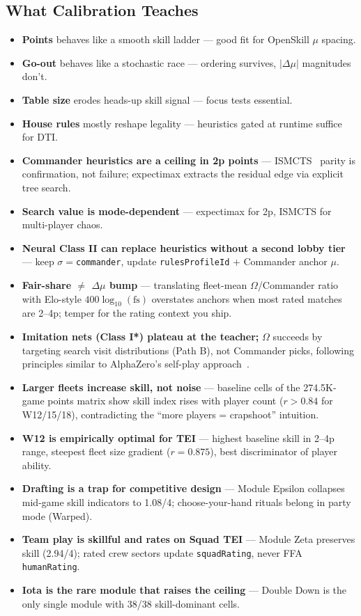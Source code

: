 \documentclass[11pt,letterpaper]{article}
\begin{document}
\subsection{What Calibration Teaches}
\begin{itemize}
\item \textbf{Points} behaves like a smooth skill ladder --- good fit for OpenSkill $\mu$ spacing.
\item \textbf{Go-out} behaves like a stochastic race --- ordering survives, $|\Delta\mu|$ magnitudes don't.
\item \textbf{Table size} erodes heads-up skill signal --- focus tests essential.
\item \textbf{House rules} mostly reshape legality --- heuristics gated at runtime suffice for DTI.
\item \textbf{Commander heuristics are a ceiling in 2p points} --- ISMCTS~\cite{cowling2012ismcts} parity is confirmation, not failure; expectimax extracts the residual edge via explicit tree search.
\item \textbf{Search value is mode-dependent} --- expectimax for 2p, ISMCTS for multi-player chaos.
\item \textbf{Neural Class II can replace heuristics without a second lobby tier} --- keep $\sigma=$\texttt{commander}, update \texttt{rulesProfileId} + Commander anchor $\mu$.
\item \textbf{Fair-share $\neq$ $\Delta\mu$ bump} --- translating fleet-mean $\Omega$/Commander ratio with Elo-style $400 \log_{10}(\text{fs})$ overstates anchors when most rated matches are 2--4p; temper for the rating context you ship.
\item \textbf{Imitation nets (Class I*) plateau at the teacher;} $\Omega$ succeeds by targeting search visit distributions (Path B), not Commander picks, following principles similar to AlphaZero's self-play approach~\cite{silver2017alphazero}.
\item \textbf{Larger fleets increase skill, not noise} --- baseline cells of the 274.5K-game points matrix show skill index rises with player count ($r > 0.84$ for W12/15/18), contradicting the ``more players = crapshoot'' intuition.
\item \textbf{W12 is empirically optimal for TEI} --- highest baseline skill in 2--4p range, steepest fleet size gradient ($r = 0.875$), best discriminator of player ability.
\item \textbf{Drafting is a trap for competitive design} --- Module Epsilon collapses mid-game skill indicators to 1.08/4; choose-your-hand rituals belong in party mode (Warped).
\item \textbf{Team play is skillful and rates on Squad TEI} --- Module Zeta preserves skill (2.94/4); rated crew sectors update \texttt{squadRating}, never FFA \texttt{humanRating}.
\item \textbf{Iota is the rare module that raises the ceiling} --- Double Down is the only single module with 38/38 skill-dominant cells.
\end{itemize}
\end{document}
